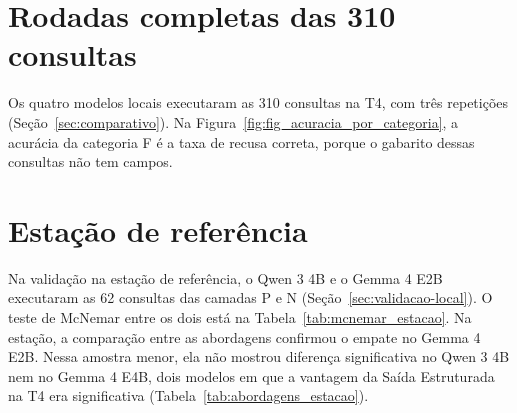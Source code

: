 \section{Rodadas completas das 310 consultas}
\label{apx:res-310}

Os quatro modelos locais executaram as 310 consultas na T4, com três repetições (Seção~\ref{sec:comparativo}). Na Figura~\ref{fig:fig_acuracia_por_categoria}, a acurácia da categoria F é a taxa de recusa correta, porque o gabarito dessas consultas não tem campos.








\section{Estação de referência}
\label{apx:res-estacao}

Na validação na estação de referência, o Qwen 3 4B e o Gemma 4 E2B executaram as 62 consultas das camadas P e N (Seção~\ref{sec:validacao-local}). O teste de McNemar entre os dois está na Tabela~\ref{tab:mcnemar_estacao}. Na estação, a comparação entre as abordagens confirmou o empate no Gemma 4 E2B. Nessa amostra menor, ela não mostrou diferença significativa no Qwen 3 4B nem no Gemma 4 E4B, dois modelos em que a vantagem da Saída Estruturada na T4 era significativa (Tabela~\ref{tab:abordagens_estacao}).




\begin{landscape}
\end{landscape}

